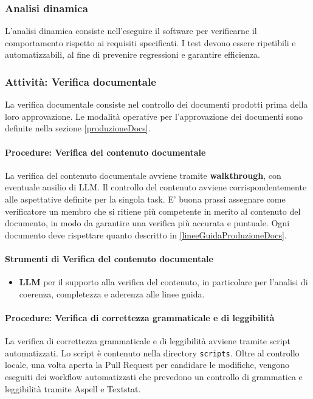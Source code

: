 \documentclass[a4paper,12pt]{article}
\begin{document}
\subsubsection{Analisi dinamica}
L'analisi dinamica consiste nell'eseguire il software per verificarne il comportamento rispetto ai requisiti specificati.
I test devono essere ripetibili e automatizzabili, al fine di prevenire regressioni e garantire efficienza.

\subsubsection{Attività: Verifica documentale}
La verifica documentale consiste nel controllo dei documenti prodotti prima della loro approvazione.
Le modalità operative per l'approvazione dei documenti sono definite nella sezione \ref{produzioneDocs}.

\paragraph{Procedure: Verifica del contenuto documentale}
La verifica del contenuto documentale avviene tramite \textbf{walkthrough}, con eventuale ausilio di LLM.
Il controllo del contenuto avviene corrispondentemente alle aspettative definite per la singola task. E' buona prassi
assegnare come verificatore un membro che si ritiene più competente in merito al contenuto del documento, in modo da garantire una verifica più accurata e puntuale.
Ogni documento deve rispettare quanto descritto in \ref{lineeGuidaProduzioneDocs}.
\paragraph{Strumenti di Verifica del contenuto documentale}
\begin{itemize}
    \item \textbf{LLM} per il supporto alla verifica del contenuto, in particolare per l'analisi di coerenza, completezza e aderenza alle linee guida.
\end{itemize}
\paragraph{Procedure: Verifica di correttezza grammaticale e di leggibilità}
La verifica di correttezza grammaticale e di leggibilità avviene tramite script automatizzati.
Lo script è contenuto nella directory \texttt{scripts}.
Oltre al controllo locale, una volta aperta la Pull Request per candidare le modifiche,
vengono eseguiti dei workflow automatizzati che prevedono un controllo di grammatica e 
leggibilità tramite Aspell e Textstat.\\
\end{document}
